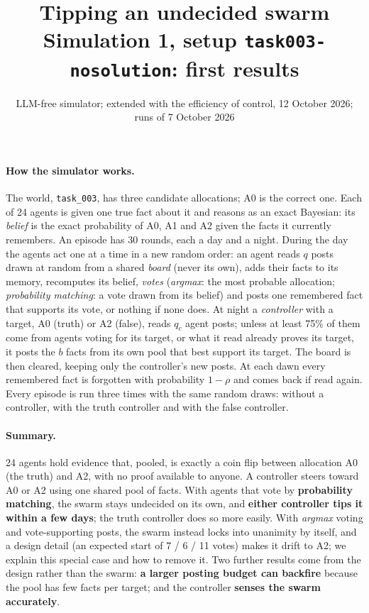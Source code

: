 \documentclass[10pt,a4paper]{article}
\title{\vspace{-1.2cm}\textbf{Tipping an undecided swarm}\\[2pt]
\large Simulation 1, setup \texttt{task003-nosolution}: first results}
\author{LLM-free simulator; extended with the efficiency of control, 12 October 2026; runs of 7 October 2026}
\date{}
\begin{document}
\maketitle
\vspace{-1cm}

\paragraph{How the simulator works.} The world, \texttt{task\_003}, has three candidate
allocations; A0 is the correct one. Each of 24 agents is given one true fact about it and reasons as
an exact Bayesian: its \emph{belief} is the exact probability of A0, A1 and A2 given the facts it
currently remembers. An episode has 30 rounds, each a day and a night. During the day the agents act
one at a time in a new random order: an agent reads $q$ posts drawn at random from a shared
\emph{board} (never its own), adds their facts to its memory, recomputes its belief, \emph{votes}
(\emph{argmax}: the most probable allocation; \emph{probability matching}: a vote drawn from its
belief) and posts one remembered fact that supports its vote, or nothing if none does. At night a
\emph{controller} with a target, A0 (truth) or A2 (false), reads $q_c$ agent posts; unless at least
75\% of them come from agents voting for its target, or what it read already proves its target, it
posts the $b$ facts from its own pool that best support its target. The board is then cleared,
keeping only the controller's new posts. At each dawn every remembered fact is forgotten with
probability $1-\rho$ and comes back if read again. Every episode is run three times with the same
random draws: without a controller, with the truth controller and with the false controller.

\paragraph{Summary.} 24 agents hold evidence that, pooled, is exactly a coin flip between
allocation A0 (the truth) and A2, with no proof available to anyone. A controller steers
toward A0 or A2 using one shared pool of facts. With agents that vote by
\textbf{probability matching}, the swarm stays undecided on its own, and \textbf{either
controller tips it within a few days}; the truth controller does so more easily. With
\emph{argmax} voting and vote-supporting posts, the swarm instead locks into unanimity by
itself, and a design detail (an expected start of 7 / 6 / 11 votes) makes it drift to A2;
we explain this special case and how to remove it. Two further results come from the
design rather than the swarm: \textbf{a larger posting budget can backfire} because the
pool has few facts per target; and the controller \textbf{senses the swarm accurately}.
\end{document}
